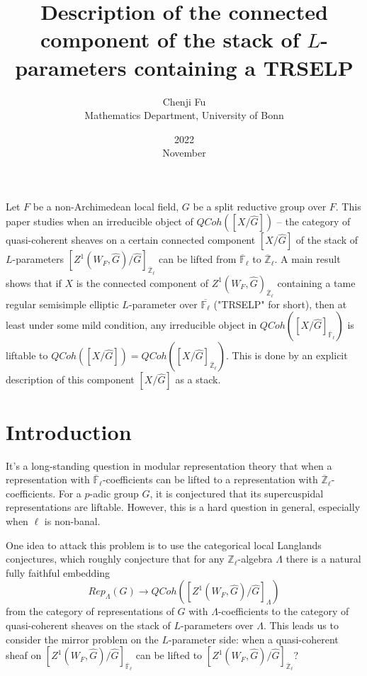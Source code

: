 \documentclass{article}
\title{Description of the connected component of the stack of $L$-parameters containing a TRSELP}
\date{2022\\ November}
\author{Chenji Fu\\ Mathematics Department, University of Bonn}
\newcommand{\red}[1]{\textcolor{red}{#1}}
\begin{document}
	\maketitle
	
	
	Let $F$ be a non-Archimedean local field, $G$ be a split reductive group over $F$. This paper studies when an irreducible object of $QCoh([X/\hat{G}])$ -- the category of quasi-coherent sheaves on a certain connected component $[X/\hat{G}]$ of the stack of $L$-parameters $[Z^1(W_F, \hat{G})/\hat{G}]_{\overline{\mathbb{Z}}_{\ell}}$ can be lifted from $\overline{\mathbb{F}}_{\ell}$ to $\overline{\mathbb{Z}}_{\ell}$. A main result shows that if $X$ is the connected component of $Z^1(W_F, \hat{G})_{\overline{\mathbb{Z}}_{\ell}}$ containing a tame regular semisimple elliptic $L$-parameter over $\overline{\mathbb{F}_{\ell}}$ ("TRSELP" for short), then at least under some mild condition, any irreducible object in $QCoh([X/\hat{G}]_{\overline{\mathbb{F}}_{\ell}})$ is liftable to $QCoh([X/\hat{G}])=QCoh([X/\hat{G}]_{\overline{\mathbb{Z}}_{\ell}})$. This is done by an explicit description of this component $[X/\hat{G}]$ as a stack.
	
	\section{Introduction}
	
	It's a long-standing question in modular representation theory that when a representation with $\overline{\mathbb{F}}_{\ell}$-coefficients can be lifted to a representation with $\overline{\mathbb{Z}}_{\ell}$-coefficients. For a $p$-adic group $G$, it is conjectured that its supercuspidal representations are liftable. However, this is a hard question in general, especially when $\ell$ is non-banal.
	
	One idea to attack this problem is to use the categorical local Langlands conjectures, which roughly conjecture that for any $\mathbb{Z}_{\ell}$-algebra $\Lambda$ there is a natural fully faithful embedding 
	$$Rep_{\Lambda}(G) \to QCoh([Z^1(W_F, \hat{G})/\hat{G}]_{\Lambda})$$
	from the category of representations of $G$ with $\Lambda$-coefficients to the category of quasi-coherent sheaves on the stack of $L$-parameters over $\Lambda$. This leads us to consider the mirror problem on the $L$-parameter side: when a quasi-coherent sheaf on $[Z^1(W_F, \hat{G})/\hat{G}]_{\overline{\mathbb{F}}_{\ell}}$ can be lifted to $[Z^1(W_F, \hat{G})/\hat{G}]_{\overline{\mathbb{Z}}_{\ell}}$?
	
\end{document}
